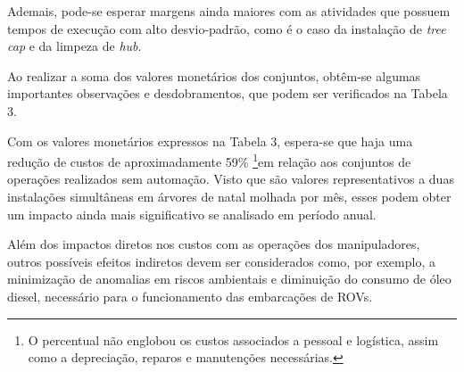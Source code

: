 Ademais, pode-se esperar margens ainda maiores com as atividades que possuem tempos de execução com alto desvio-padrão, como é o caso da instalação de \textit{tree cap} e da limpeza de \textit{hub}. 

Ao realizar a soma dos valores monetários dos conjuntos, obtêm-se algumas importantes observações e desdobramentos, que podem ser verificados na Tabela 3.

\begin{table}[h!]
	\centering
	\caption{Soma dos custos das atividades com manipuladores}
	\label{tab:cost4}
	\def\arraystretch{1.2}
\end{table}

Com os valores monetários expressos na Tabela 3, espera-se que haja uma redução de custos de aproximadamente 59\%  \footnote{O percentual não englobou os custos associados a pessoal e logística, assim como a depreciação, reparos e manutenções necessárias.}em relação aos conjuntos de operações realizados sem automação. Visto que são valores representativos a duas instalações simultâneas em árvores de natal molhada por mês, esses podem obter um impacto ainda mais significativo se analisado em período anual.

Além dos impactos diretos nos custos com as operações dos manipuladores, outros possíveis efeitos indiretos devem ser considerados como, por exemplo, a minimização de anomalias em riscos ambientais e diminuição do consumo de óleo diesel, necessário para o funcionamento das embarcações de ROVs. 

